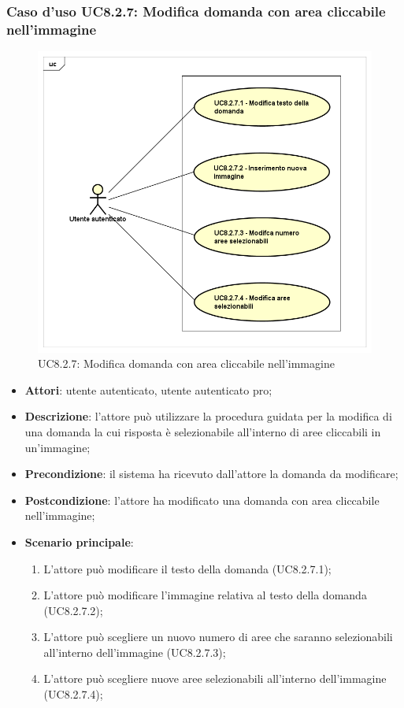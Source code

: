 \subsubsection{Caso d'uso UC8.2.7: Modifica domanda con area cliccabile nell'immagine}
\label{UC8.2.7}
\begin{figure}[h]
	\centering
	\includegraphics[scale=0.5,keepaspectratio]{UML/UC8_2_7.png}
	\caption{UC8.2.7: Modifica domanda con area cliccabile nell'immagine}
\end{figure}
\FloatBarrier
\begin{itemize}
	\item \textbf{Attori}: utente autenticato, utente autenticato pro;
	\item \textbf{Descrizione}: l'attore può utilizzare la procedura guidata per la modifica di una domanda la cui risposta è selezionabile all'interno di aree cliccabili in un'immagine;
	\item \textbf{Precondizione}:  il sistema ha ricevuto dall'attore la domanda da modificare; 
	\item \textbf{Postcondizione}: l'attore ha modificato una domanda con area cliccabile nell'immagine;
	\item \textbf{Scenario principale}:
		\begin{enumerate}
	       	\item L'attore può modificare il testo della domanda (UC8.2.7.1);
	        \item L'attore può modificare l'immagine relativa al testo della domanda (UC8.2.7.2);
			\item L'attore può scegliere un nuovo numero di aree che saranno selezionabili all'interno dell'immagine (UC8.2.7.3);
			\item L'attore può scegliere nuove aree selezionabili all'interno dell'immagine (UC8.2.7.4);
	 	\end{enumerate}
\end{itemize}

